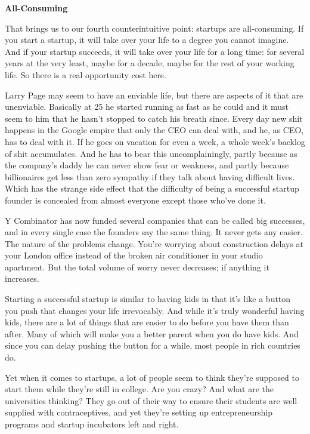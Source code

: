 \documentclass[12pt]{book}
\begin{document}
\textbf{All-Consuming}

That brings us to our fourth counterintuitive point: startups are
all-consuming. If you start a startup, it will take over your life to a
degree you cannot imagine. And if your startup succeeds, it will take
over your life for a long time: for several years at the very least,
maybe for a decade, maybe for the rest of your working life. So there is
a real opportunity cost here.

Larry Page may seem to have an enviable life, but there are aspects of
it that are unenviable. Basically at 25 he started running as fast as he
could and it must seem to him that he hasn't stopped to catch his breath
since. Every day new shit happens in the Google empire that only the CEO
can deal with, and he, as CEO, has to deal with it. If he goes on
vacation for even a week, a whole week's backlog of shit accumulates.
And he has to bear this uncomplainingly, partly because as the company's
daddy he can never show fear or weakness, and partly because
billionaires get less than zero sympathy if they talk about having
difficult lives. Which has the strange side effect that the difficulty
of being a successful startup founder is concealed from almost everyone
except those who've done it.

Y Combinator has now funded several companies that can be called big
successes, and in every single case the founders say the same thing. It
never gets any easier. The nature of the problems change. You're
worrying about construction delays at your London office instead of the
broken air conditioner in your studio apartment. But the total volume of
worry never decreases; if anything it increases.

Starting a successful startup is similar to having kids in that it's
like a button you push that changes your life irrevocably. And while
it's truly wonderful having kids, there are a lot of things that are
easier to do before you have them than after. Many of which will make
you a better parent when you do have kids. And since you can delay
pushing the button for a while, most people in rich countries do.

Yet when it comes to startups, a lot of people seem to think they're
supposed to start them while they're still in college. Are you crazy?
And what are the universities thinking? They go out of their way to
ensure their students are well supplied with contraceptives, and yet
they're setting up entrepreneurship programs and startup incubators left
and right.
\end{document}
